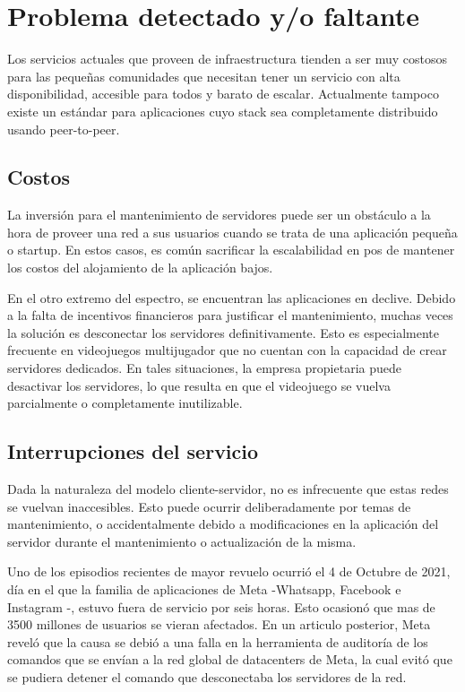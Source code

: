 \section{Problema detectado y/o faltante}
Los servicios actuales que proveen de infraestructura tienden a ser muy costosos para las pequeñas comunidades que necesitan tener un servicio con alta disponibilidad, accesible para todos y barato de escalar. Actualmente tampoco existe un estándar para aplicaciones cuyo stack sea completamente distribuido usando peer-to-peer.

\subsection{Costos}
La inversión para el mantenimiento de servidores puede ser un obstáculo a la hora de proveer una red a sus usuarios cuando se trata de una aplicación pequeña o startup. En estos casos, es común sacrificar la escalabilidad en pos de mantener los costos del alojamiento de la aplicación bajos.

En el otro extremo del espectro, se encuentran las aplicaciones en declive. Debido a la falta de incentivos financieros para justificar el mantenimiento, muchas veces la solución es desconectar los servidores definitivamente. Esto es especialmente frecuente en videojuegos multijugador que no cuentan con la capacidad de crear servidores dedicados. En tales situaciones, la empresa propietaria puede desactivar los servidores, lo que resulta en que el videojuego se vuelva parcialmente o completamente inutilizable. \cite{dead-games}

\subsection{Interrupciones del servicio}
Dada la naturaleza del modelo cliente-servidor, no es infrecuente que estas redes se vuelvan inaccesibles. Esto puede ocurrir deliberadamente por temas de mantenimiento, o accidentalmente debido a modificaciones en la aplicación del servidor durante el mantenimiento o actualización de la misma.

Uno de los episodios recientes de mayor revuelo ocurrió el 4 de Octubre de 2021, día en el que la familia de aplicaciones de Meta -Whatsapp, Facebook e Instagram -, estuvo fuera de servicio por seis horas. Esto ocasionó que mas de 3500 millones de usuarios se vieran afectados. En un articulo posterior, Meta reveló que la causa se debió a una falla en la herramienta de auditoría de los comandos que se envían a la red global de datacenters de Meta, la cual evitó que se pudiera detener el comando que desconectaba los servidores de la red. \parencite{meta-offline}

